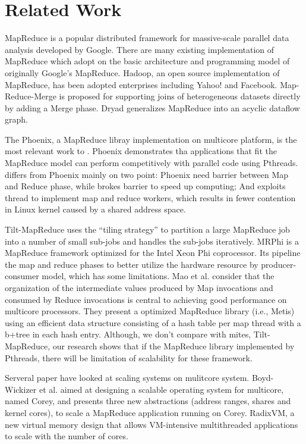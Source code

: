 \section{Related Work}
\label{sec:rela}
MapReduce is a popular distributed framework for massive-scale parallel data analysis developed by Google.
There are many existing implementation of MapReduce which adopt on the basic architecture and  programming model of originally Google's MapReduce.
Hadoop\cite{White2010Hadoop}, an open source implementation of MapReduce, has been adopted enterprises including Yahoo! and Facebook. 
Map-Reduce-Merge\cite{Yang2007MapReducemerge} is proposed for supporting joins of heterogeneous datasets directly by adding a Merge phase.
Dryad\cite{isard2007dryad} generalizes MapReduce into an acyclic dataflow graph.

The Phoenix, a MapReduce libray implementation on multicore platform, is the most relevant work to \myds. 
Phoenix demonstrates tha applications that fit the MapReduce model can perform competitively with parallel code using Pthreads.
\myds differs from Phoenix mainly on two point:
Phoenix need barrier between Map and Reduce phase, while \myds brokes barrier to speed up computing;
And \myds exploits \myth thread to implement map and reduce workers, which results in fewer contention in Linux kernel caused by a shared address space.

Tilt-MapReduce\cite{chen2010tiled} uses the “tiling strategy” to partition a large MapReduce job into a number of small sub-jobs and handles the sub-jobs iteratively.
MRPhi\cite{lu2013mrphi} is a MapReduce framework optimized for the Intel Xeon Phi coprocessor.
Its pipeline the map and reduce phases to better utilize the hardware resource by producer-consumer model, which has some limitations.
Mao et al.\cite{mao2010metis} consider that the organization of the intermediate values produced by Map invocations and consumed by Reduce invocations is central to achieving good performance on multicore processors. 
They present a optimized MapReduce library (i.e., Metis) using an efficient data structure consisting of a hash table per map thread with a b+tree in each hash entry.
Although, we don't compare \myds with mites, Tilt-MapReduce,
our research shows that if the MapReduce library implemented by Pthreads, there will be limitation of scalability for these framework.


Serveral paper have looked at scaling systems on mulitcore system.
Boyd-Wickizer et al. aimed at designing a scalable operating system for multicore, named Corey\cite{boyd2008corey}, and presents three new abstractions (address ranges, shares and kernel cores), to scale a MapReduce application running on Corey.
RadixVM\cite{clements2013radixvm}, a new virtual memory design
that allows VM-intensive multithreaded applications to scale
with the number of cores.


